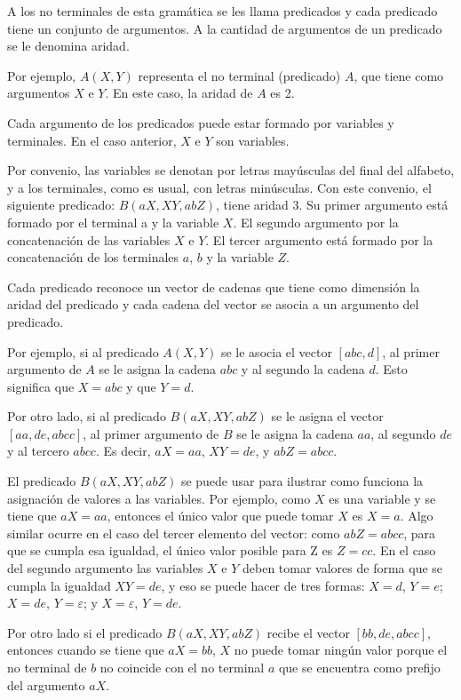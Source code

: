 A los no terminales de esta gramática se les llama predicados y cada predicado tiene un conjunto de argumentos. 
A la cantidad de argumentos de un predicado se le denomina aridad.

Por ejemplo, $A(X,Y)$ representa el no terminal (predicado) $A$, que tiene como argumentos $X$ e $Y$. En este caso, la aridad de $A$ es 2.

Cada argumento de los predicados puede estar formado por variables y terminales. En el caso anterior, $X$ e $Y$ son variables.

Por convenio, las variables se denotan por letras mayúsculas del final del alfabeto, y a los terminales, como es 
usual, con letras minúsculas. Con este convenio, el siguiente predicado: $B(aX, XY, abZ)$, tiene aridad 3. Su 
primer argumento está formado por el terminal a y la variable $X$. El segundo argumento por la concatenación 
de las variables $X$ e $Y$. El tercer argumento está formado por la concatenación de los terminales $a$, $b$ y 
la variable $Z$. 

Cada predicado reconoce un vector de cadenas que tiene como dimensión la aridad del predicado y cada cadena del vector se asocia a un argumento del predicado.

Por ejemplo, si al predicado $A(X,Y)$ se le asocia el vector $[abc,d]$, al primer argumento de $A$ se le asigna
la cadena $abc$ y al segundo la cadena $d$. Esto significa que $X=abc$ y que $Y=d$.

Por otro lado, si al predicado $B(aX, XY, abZ)$ se le asigna el vector $[aa,de,abcc]$,
al primer argumento de $B$ se le asigna la cadena $aa$, al segundo $de$ y al tercero $abcc$. Es decir, $aX=aa$, $XY=de$, y $abZ=abcc$.

El predicado $B(aX, XY, abZ)$ se puede usar para ilustrar como funciona la asignación de valores a las variables.
Por ejemplo, como $X$ es una variable y se tiene que $aX=aa$, entonces el único valor que puede tomar $X$ es $X=a$. 
Algo similar ocurre en el caso del tercer elemento del vector: como $abZ=abcc$, para que se cumpla esa igualdad, 
el único valor posible para Z es $Z=cc$. En el caso del segundo argumento las variables $X$ e $Y$ deben tomar valores 
de forma que se cumpla la igualdad $XY=de$, y eso se puede hacer de tres formas: $X=d$, $Y=e$; $X=de$, $Y=\varepsilon$; 
y $X=\varepsilon$, $Y=de$. 

Por otro lado si el predicado $B(aX, XY, abZ)$ recibe el vector $[bb,de,abcc]$, entonces cuando se tiene que $aX=bb$,
$X$ no puede tomar ningún valor porque el no terminal de $b$ no coincide con el no terminal $a$ que se encuentra como 
prefijo del argumento $aX$.

